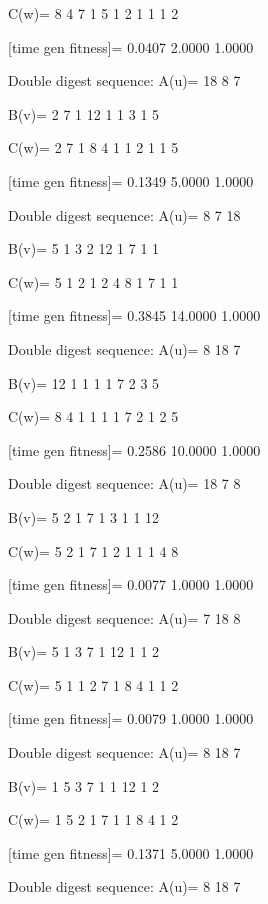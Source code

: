 C(w)=
     8     4     7     1     5     1     2     1     1     1     2

[time gen fitness]=
    0.0407    2.0000    1.0000

Double digest sequence:
A(u)=
    18     8     7

B(v)=
     2     7     1    12     1     1     3     1     5

C(w)=
     2     7     1     8     4     1     1     2     1     1     5

[time gen fitness]=
    0.1349    5.0000    1.0000

Double digest sequence:
A(u)=
     8     7    18

B(v)=
     5     1     3     2    12     1     7     1     1

C(w)=
     5     1     2     1     2     4     8     1     7     1     1

[time gen fitness]=
    0.3845   14.0000    1.0000

Double digest sequence:
A(u)=
     8    18     7

B(v)=
    12     1     1     1     1     7     2     3     5

C(w)=
     8     4     1     1     1     1     7     2     1     2     5

[time gen fitness]=
    0.2586   10.0000    1.0000

Double digest sequence:
A(u)=
    18     7     8

B(v)=
     5     2     1     7     1     3     1     1    12

C(w)=
     5     2     1     7     1     2     1     1     1     4     8

[time gen fitness]=
    0.0077    1.0000    1.0000

Double digest sequence:
A(u)=
     7    18     8

B(v)=
     5     1     3     7     1    12     1     1     2

C(w)=
     5     1     1     2     7     1     8     4     1     1     2

[time gen fitness]=
    0.0079    1.0000    1.0000

Double digest sequence:
A(u)=
     8    18     7

B(v)=
     1     5     3     7     1     1    12     1     2

C(w)=
     1     5     2     1     7     1     1     8     4     1     2

[time gen fitness]=
    0.1371    5.0000    1.0000

Double digest sequence:
A(u)=
     8    18     7

